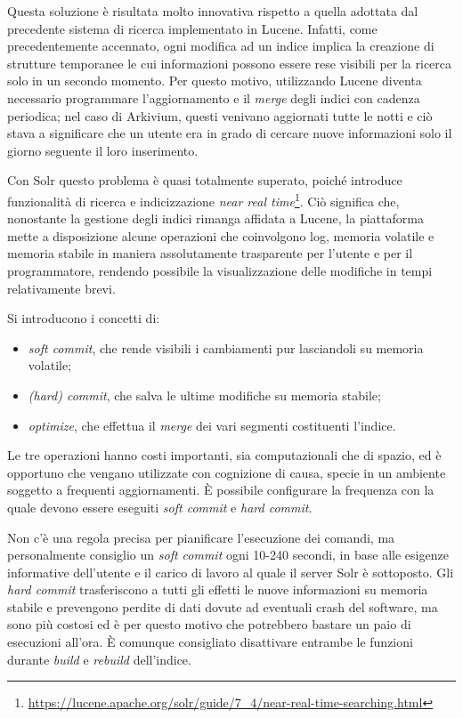 \vspace{1em}

Questa soluzione è risultata molto innovativa rispetto a quella adottata dal precedente sistema di ricerca implementato in Lucene. Infatti, come precedentemente accennato, ogni modifica ad un indice implica la creazione di strutture temporanee le cui informazioni possono essere rese visibili per la ricerca solo in un secondo momento. Per questo motivo, utilizzando Lucene diventa necessario programmare l’aggiornamento e il \textit{merge} degli indici con cadenza periodica; nel caso di Arkivium, questi venivano aggiornati tutte le notti e ciò stava a significare che un utente era in grado di cercare nuove informazioni solo il giorno seguente il loro inserimento.

Con Solr questo problema è quasi totalmente superato, poiché introduce funzionalità di ricerca e indicizzazione \textit{near real time}\footnote{\url{https://lucene.apache.org/solr/guide/7_4/near-real-time-searching.html}}. Ciò significa che, nonostante la gestione degli indici rimanga affidata a Lucene, la piattaforma mette a disposizione alcune operazioni che coinvolgono log, memoria volatile e memoria stabile in maniera assolutamente trasparente per l’utente e per il programmatore, rendendo possibile la visualizzazione delle modifiche in tempi relativamente brevi.

\pagebreak
\noindent Si introducono i concetti di:
\begin{itemize}
\item \textit{soft commit}, che rende visibili i cambiamenti pur lasciandoli su memoria volatile;
\item \textit{(hard) commit}, che salva le ultime modifiche su memoria stabile;
\item \textit{optimize}, che effettua il \textit{merge} dei vari segmenti costituenti l’indice.
\end{itemize}
Le tre operazioni hanno costi importanti, sia computazionali che di spazio, ed è opportuno che vengano utilizzate con cognizione di causa, specie in un ambiente soggetto a frequenti aggiornamenti. È possibile configurare la frequenza con la quale devono essere eseguiti \textit{soft commit} e \textit{hard commit}. 

Non c’è una regola precisa per pianificare l'esecuzione dei comandi, ma personalmente consiglio un \textit{soft commit} ogni 10-240 secondi, in base alle esigenze informative dell’utente e il carico di lavoro al quale il server Solr è sottoposto. Gli \textit{hard commit} trasferiscono a tutti gli effetti le nuove informazioni su memoria stabile e prevengono perdite di dati dovute ad eventuali crash del software, ma sono più costosi ed è per questo motivo che potrebbero bastare un paio di esecuzioni all’ora. È comunque consigliato disattivare entrambe le funzioni durante \textit{build} e \textit{rebuild} dell’indice.

